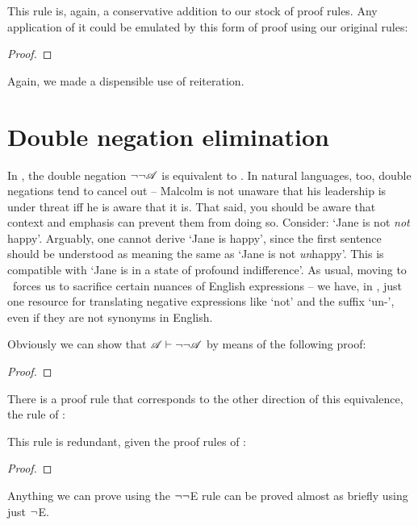 This rule is, again, a conservative addition to our stock of proof rules. Any application of it could be emulated by this form of proof using our original rules:
\begin{proof}
	\have[\ ]{}{\vdots}
		\open
		\close
\end{proof}
Again, we made a dispensible use of reiteration.

\section{Double negation elimination}

In \TFL, the double negation $\neg\neg\mathscr{A}$ is equivalent to . In natural languages, too, double negations tend to cancel out – Malcolm is not unaware that his leadership is under threat iff he is aware that it is. That said, you should be aware that context and emphasis can prevent them from doing so. Consider: `Jane is not \emph{not} happy'. Arguably, one cannot derive `Jane is happy', since the first sentence should be understood as meaning the same as  `Jane is not \emph{un}happy'. This is compatible with `Jane is in a state of profound indifference'. As usual, moving to \TFL\ forces us to sacrifice certain nuances of English expressions – we have, in \TFL, just one resource for translating negative expressions like `not' and the suffix `un-', even if they are not synonyms in English.

Obviously we can show that $\mathscr{A} \vdash \neg\neg\mathscr{A}$ by means of the following proof:
\begin{proof}
\open
{}
\close
{}	
\end{proof}

There is a proof rule that corresponds to the other direction of this equivalence, the rule of :


This rule is redundant, given the proof rules of \TFL: \begin{proof}
	\open
	\close
\end{proof}
Anything we can prove using the $\neg\neg$E rule can be proved almost as briefly using just $\neg$E.



